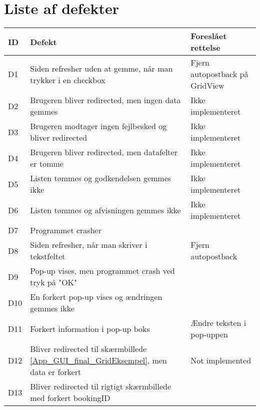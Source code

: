 \section{Liste af defekter}
\label{App_Test_Defects}
\begin{centering}
\begin{longtable}{| p{0.5 cm} | p{10 cm} | p{5 cm} |}
\hline
ID & Defekt & Foreslået rettelse\\
\hline
D1 & Siden refresher uden at gemme, når man trykker i en checkbox & Fjern autopostback på GridView\\
\hline
D2 & Brugeren bliver redirected, men ingen data gemmes & Ikke implementeret\\
\hline
D3 & Brugeren modtager ingen fejlbesked og bliver redirected & Ikke implementeret\\
\hline
D4 & Brugeren bliver redirected, men datafelter er tomme & Ikke implementeret\\
\hline
D5 & Listen tømmes og godkendelsen gemmes ikke & Ikke implementeret\\
\hline
D6 & Listen tømmes og afvisningen gemmes ikke & Ikke implementeret \\
\hline
D7 & Programmet crasher & \\
\hline
D8 & Siden refresher, når man skriver i tekstfeltet & Fjern autopostback \\
\hline
D9 & Pop-up vises, men programmet crash ved tryk på "OK" & \\
\hline
D10 & En forkert pop-up vises og ændringen gemmes ikke & \\
\hline
D11 & Forkert information i pop-up boks & Ændre teksten i pop-uppen \\
\hline
D12 & Bliver redirected til skærmbillede \ref{App_GUI_final_GridEksempel}, men data er forkert & Not implemented\\
\hline
D13 & Bliver redirected til rigtigt skærmbillede med forkert bookingID & \\
\hline
\end{longtable}
\end{centering}